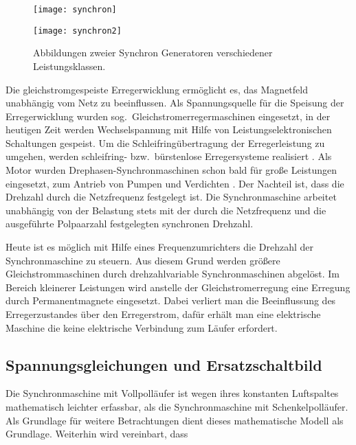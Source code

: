 \begin{figure}[h!]
\centering
\begin{minipage}{6cm}
\texttt{[image: synchron]}
\end{minipage}
\hfill
\begin{minipage}{6cm}
\texttt{[image: synchron2]}
\end{minipage}
\caption{Abbildungen zweier Synchron Generatoren verschiedener Leistungsklassen.}
\label{fig:synchron-generatoren}
\end{figure}

Die gleichstromgespeiste Erregerwicklung ermöglicht es, das Magnetfeld unabhängig vom Netz zu beeinflussen.
Als Spannungsquelle für die Speisung der Erregerwicklung wurden sog.\ Gleichstromerregermaschinen eingesetzt, in der heutigen Zeit werden Wechselspannung mit Hilfe von Leistungselektronischen Schaltungen gespeist.
Um die Schleifringübertragung der Erregerleistung zu umgehen, werden schleifring- bzw.\ bürstenlose Erregersysteme realisiert \autocite[S.~108]{ternes2012}.
Als Motor wurden Drephasen-Synchronmaschinen schon bald für große Leistungen eingesetzt, \zB zum Antrieb von Pumpen und Verdichten \autocite[S.~486]{mullerI2005}.
Der Nachteil ist, dass die Drehzahl durch die Netzfrequenz festgelegt ist.
Die Synchronmaschine arbeitet unabhängig von der Belastung stets mit der durch die Netzfrequenz und die ausgeführte Polpaarzahl festgelegten synchronen Drehzahl.

Heute ist es möglich mit Hilfe eines Frequenzumrichters die Drehzahl der Synchronmaschine zu steuern.
Aus diesem Grund werden größere Gleichstrommaschinen durch drehzahlvariable Synchronmaschinen abgelöst.
Im Bereich kleinerer Leistungen wird anstelle der Gleichstromerregung eine Erregung durch Permanentmagnete eingesetzt.
Dabei verliert man die Beeinflussung des Erregerzustandes über den Erregerstrom, dafür erhält man eine elektrische Maschine die keine elektrische Verbindung zum Läufer erfordert.

\subsection{Spannungsgleichungen und Ersatzschaltbild}\label{sec:spannungsgleichung-esb}

Die Synchronmaschine mit Vollpolläufer ist wegen ihres konstanten Luftspaltes mathematisch leichter erfassbar, als die Synchronmaschine mit Schenkelpolläufer.
Als Grundlage für weitere Betrachtungen dient dieses mathematische Modell als Grundlage.
Weiterhin wird vereinbart, dass

